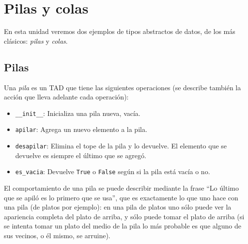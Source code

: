 
%

\chapter{Pilas y colas}

En esta unidad veremos dos ejemplos de tipos abstractos de datos, de los más
clásicos: {\it pilas} y {\it colas}.

\section{Pilas}

Una {\it pila} es un TAD que tiene las siguientes operaciones (se describe también la acción que
lleva adelante cada operación):

\begin{itemize}
\item \lstinline+__init__+: Inicializa una pila nueva, vacía.

\item \lstinline!apilar!: Agrega un nuevo elemento a la pila.

\item \lstinline!desapilar!: Elimina el tope de la pila y lo devuelve.
El elemento que se devuelve es siempre el último que se agregó.

\item \lstinline!es_vacia!: Devuelve \lstinline!True! o \lstinline!False!
según si la pila está vacía o no.

\end{itemize}

El comportamiento de una pila se puede describir mediante la frase
``Lo último que se apiló es lo primero que se usa'', que es exactamente lo que
uno hace con una pila (de platos por ejemplo): en una pila de platos uno sólo
puede ver la apariencia completa del plato de arriba, y sólo puede tomar el
plato de arriba (si se intenta tomar un plato del medio de la pila lo más
probable es que alguno de sus vecinos, o él mismo, se arruine).

